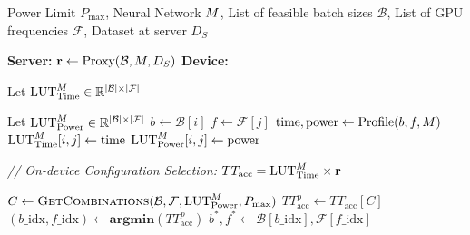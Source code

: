 \begin{algorithmic}[1]
    \Require Power Limit $P_{\text{max}}$, Neural Network $M$, List of feasible batch sizes $\mathcal{B}$, List of GPU frequencies $\mathcal{F}$, Dataset at server $D_{S}$

    \State \textbf{Server:}
    \State $\mathbf{r} \gets \text{Proxy}(\mathcal{B}, M, D_{S})$ 
    \State
    \State \textbf{Device:}
     
    \State Let $\text{LUT}^{M}_{\text{Time}} \in \mathbb{R}^{|\mathcal{B}| \times |\mathcal{F}|}$
    
    \State Let $\text{LUT}^{M}_{\text{Power}} \in \mathbb{R}^{|\mathcal{B}| \times |\mathcal{F}|}$
        \State $b \gets \mathcal{B}[i]$
                \State $f \gets \mathcal{F}[j]$ 
                \State $\text{time}, \text{power} \gets \text{Profile}(b, f, M)$ 
                \State $\text{LUT}^{M}_{\text{Time}}[i, j] \gets \text{time}$
                \State $\text{LUT}^{M}_{\text{Power}}[i, j] \gets \text{power}$
        \EndFor
    \EndFor

    \State \textit{// On-device Configuration Selection:}
    \State $TT_{\text{acc}} = \text{LUT}^{M}_{\text{Time}} \times \mathbf{r}$  
    
    \State $C \gets \Call{GetCombinations}{\mathcal{B}, \mathcal{F}, \text{LUT}^{\nn}_{\text{Power}}, P_{\text{max}}}$ 
    \State $TT^{p}_{\text{acc}} \gets TT_{\text{acc}} [C]$
    \State $(b\_\text{idx}, f\_\text{idx})\gets \textbf{argmin} (TT^{p}_{\text{acc}})$
    \State $b^{*}, f^{*} \gets \mathcal{B}[b\_\text{idx}], \mathcal{F}[f\_\text{idx}]$ 

\end{algorithmic}

